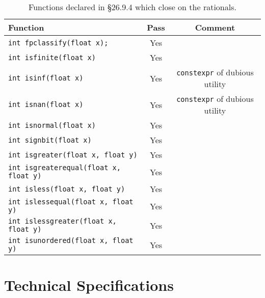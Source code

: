 \documentclass[prd,preprint,amsmath,amssymb,nofootinbib,eqsecnum]{revtex4-1}
\newcommand{\constexpr}{\code{constexpr}\xspace}
\newcommand{\code}[1]{{\tt #1}}
\begin{document}
\begin{table}[h]
	\begin{tabular}{lcc}
		Function & Pass & Comment
	\\
	\hline \hline
		\code{int fpclassify(float x);} & Yes &
	\\
	\hline
		\code{int isfinite(float x)} & Yes &
	\\
	\hline
		\code{int isinf(float x)} & Yes & \constexpr of dubious utility 
	\\
	\hline
		\code{int isnan(float x)} & Yes & \constexpr of dubious utility 
	\\
	\hline
		\code{int isnormal(float x)} & Yes &
	\\
	\hline
		\code{int signbit(float x)} & Yes &
	\\
	\hline
		\code{int isgreater(float x, float y)} & Yes &
	\\
	\hline
		\code{int isgreaterequal(float x, float y)} & Yes &
	\\
	\hline
		\code{int isless(float x, float y)} & Yes &
	\\
	\hline
		\code{int islessequal(float x, float y)} & Yes &
	\\
	\hline
		\code{int islessgreater(float x, float y)} & Yes &
	\\
	\hline
		\code{int isunordered(float x, float y)} & Yes &
	\end{tabular}
\caption{Functions declared in \S 26.9.4 which close on the rationals.}
\label{tab:26.9.4}
\end{table}

\section{Technical Specifications}

\end{document}
